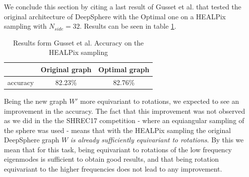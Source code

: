 We conclude this section by citing a last result of Gusset et al. that tested the original architecture of DeepSphere with the Optimal one on a HEALPix sampling with $N_{side}=32$. Results can be seen in table \ref{table:results}.
\begin{table}[h!]
	\centering
	\begin{tabular}{ c|c|c } 
		& Original graph & Optimal graph \\ 
		\hline
		accuracy & 82.23\% & 82.76\% \\ 
	\end{tabular}
	\caption{\label{table:results}Results form Gusset et al. Accuracy on the HEALPix sampling}
\end{table}
 Being the new graph $W'$ more equivariant to rotations, we expected to see an improvement in the accuracy. The fact that this improvement was not observed as we did in the the SHREC17 competition - where an equiangular sampling of the sphere was used - means that with the HEALPix sampling the original DeepSphere graph $W$ \textit{is already sufficiently equivariant to rotations}. By this we mean that for this task, being equivariant to rotations of the low frequency eigenmodes is sufficient to obtain good results, and that being rotation equivariant to the higher frequencies does not lead to any improvement.
